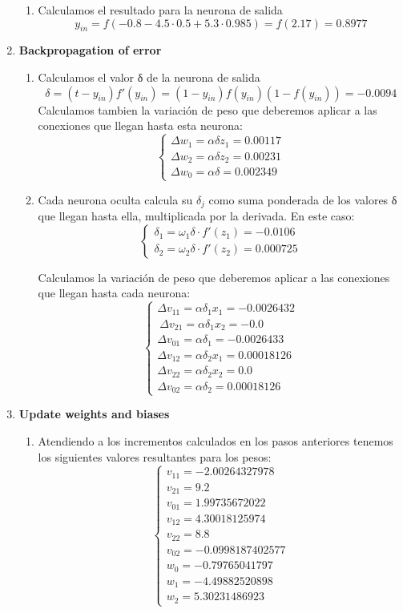 \begin{problem}[6]
\begin{enumerate}
\begin{enumerate}
\item Calculamos el resultado para la neurona de salida
\[y_{in} = f(-0.8-4.5\cdot 0.5 + 5.3 \cdot 0.985)=f(2.17) = 0.8977\]
\end{enumerate}
\item \textbf{Backpropagation of error}
\begin{enumerate}
\item Calculamos el valor δ de la neurona de salida
\[δ = (t-y_{in})f'(y_{in}) = (1-y_{in})f(y_{in})(1-f(y_{in})) = -0.0094\]
Calculamos tambien la variación de peso que deberemos aplicar a las conexiones que llegan hasta esta neurona:
\[\left\{ \begin{array}{l}
Δw_1= αδz_1 = 0.00117 \\
Δw_2= αδz_2 = 0.00231 \\
Δw_0= αδ = 0.002349
\end{array}\right.\]

\item Cada neurona oculta calcula su $δ_j$ como suma ponderada de los valores δ que llegan hasta ella, multiplicada por la derivada. En este caso:
\[\left\{ \begin{array}{l}
δ_1= ω_1 δ \cdot f'(z_1)= -0.0106\\
δ_2= ω_2 δ \cdot f'(z_2)= 0.000725
\end{array}\right.\]

Calculamos la variación de peso que deberemos aplicar a las conexiones que llegan hasta cada neurona:
\[\left\{ \begin{array}{l}
Δv_{11}= αδ_1x_1 = -0.0026432\\\
Δv_{21}= αδ_1x_2 = -0.0\\
Δv_{01}= αδ_1    = -0.0026433\\
Δv_{12}= αδ_2x_1 = 0.00018126\\
Δv_{22}= αδ_2x_2 = 0.0\\
Δv_{02}= αδ_2    = 0.00018126
\end{array}\right.\]

\end{enumerate}
\item \textbf{Update weights and biases}
\begin{enumerate}
\item Atendiendo a los incrementos calculados en los pasos anteriores tenemos los siguientes valores resultantes para los pesos:
\[\left\{ \begin{array}{l}
v_{11} =   -2.00264327978 \\
v_{21} =   9.2 \\
v_{01} =   1.99735672022 \\
v_{12} =   4.30018125974 \\
v_{22} =   8.8 \\
v_{02} =   -0.0998187402577 \\
w_0     = -0.79765041797 \\
w_1     = -4.49882520898 \\
w_2     = 5.30231486923
\end{array}\right.\]
\end{enumerate}
\end{enumerate}


\end{problem}
